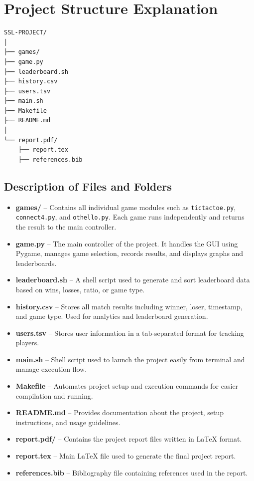 \documentclass[12pt]{article}
\begin{document}

\section{Project Structure Explanation}

\begin{verbatim}
SSL-PROJECT/
│
├── games/
├── game.py
├── leaderboard.sh
├── history.csv
├── users.tsv
├── main.sh
├── Makefile
├── README.md
│
└── report.pdf/
    ├── report.tex
    ├── references.bib
\end{verbatim}

\subsection{Description of Files and Folders}

\begin{itemize}
    \item \textbf{games/} -- Contains all individual game modules such as \texttt{tictactoe.py}, \texttt{connect4.py}, and \texttt{othello.py}. Each game runs independently and returns the result to the main controller.

    \item \textbf{game.py} -- The main controller of the project. It handles the GUI using Pygame, manages game selection, records results, and displays graphs and leaderboards.

    \item \textbf{leaderboard.sh} -- A shell script used to generate and sort leaderboard data based on wins, losses, ratio, or game type.

    \item \textbf{history.csv} -- Stores all match results including winner, loser, timestamp, and game type. Used for analytics and leaderboard generation.

    \item \textbf{users.tsv} -- Stores user information in a tab-separated format for tracking players.

    \item \textbf{main.sh} -- Shell script used to launch the project easily from terminal and manage execution flow.

    \item \textbf{Makefile} -- Automates project setup and execution commands for easier compilation and running.

    \item \textbf{README.md} -- Provides documentation about the project, setup instructions, and usage guidelines.

    \item \textbf{report.pdf/} -- Contains the project report files written in LaTeX format.

    \item \textbf{report.tex} -- Main LaTeX file used to generate the final project report.

    \item \textbf{references.bib} -- Bibliography file containing references used in the report.
\end{itemize}
\end{document}
